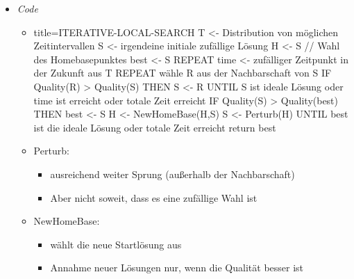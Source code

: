 \documentclass[
    12pt,
    a4paper,
    ngerman,
    color=3b,%
    marginpar=false,
    colorback=false,
    leqno,
]{tudaexercise}
\begin{document}
\begin{itemize}
\begin{itemize}
                \item \textit{Code}
                    \begin{itemize}
                        \item[]
                            \begin{ccode}[autogobble]{title={ITERATIVE-LOCAL-SEARCH}}
                            T <- Distribution von möglichen Zeitintervallen
                            S <- irgendeine initiale zufällige Lösung
                            H <- S      // Wahl des Homebasepunktes
                            best <- S
                            REPEAT
                                time <- zufälliger Zeitpunkt in der Zukunft aus T
                                REPEAT
                                    wähle R aus der Nachbarschaft von S
                                    IF Quality(R) > Quality(S) THEN
                                        S <- R
                                UNTIL S ist ideale Lösung oder time ist erreicht oder totale Zeit erreicht
                                IF Quality(S) > Quality(best) THEN
                                    best <- S
                                H <- NewHomeBase(H,S)
                                S <- Perturb(H)
                            UNTIL best ist die ideale Lösung oder totale Zeit erreicht
                            return best
                            \end{ccode}
                        \item Perturb:
                            \begin{itemize}
                                \item ausreichend weiter Sprung (außerhalb der Nachbarschaft)
                                \item Aber nicht soweit, dass es eine zufällige Wahl ist
                            \end{itemize}
                        \item NewHomeBase:
                            \begin{itemize}
                                \item wählt die neue Startlösung aus
                                \item Annahme neuer Lösungen nur, wenn die Qualität besser ist
                            \end{itemize}
                    \end{itemize}
            \end{itemize}


\end{itemize}
\end{document}
